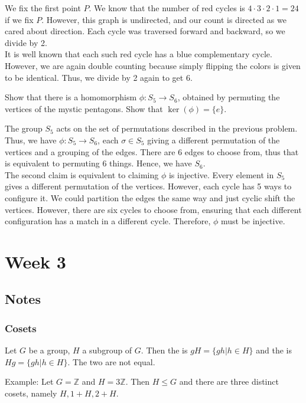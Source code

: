 \documentclass{scrartcl}
\begin{document}
\begin{soln}
	We fix the first point $P$. We know that the number of red cycles is $4 \cdot 3 \cdot 2 \cdot 1 = 24$ if we fix $P$. However, this graph is undirected, and our count is directed as we cared about direction. Each cycle was traversed forward and backward, so we divide by 2. \\
	It is well known that each such red cycle has a blue complementary cycle. However, we are again double counting because simply flipping the colors is given to be identical. Thus, we divide by 2 again to get 6.
\end{soln}

\begin{problem}[24]
    Show that there is a homomorphism $\phi : S_5 \rightarrow S_6$, obtained by permuting the vertices of the mystic pentagons. Show that $\ker(\phi) = \{e\}$.
\end{problem}

\begin{soln}
    The group $S_5$ acts on the set of permutations described in the previous problem. Thus, we have $\phi : S_5 \rightarrow S_6$, each $\sigma \in S_5$ giving a different permutation of the vertices and a grouping of the edges. There are $6$ edges to choose from, thus that is equivalent to permuting $6$ things. Hence, we have $S_6$. \\
    The second claim is equivalent to claiming $\phi$ is injective. Every element in $S_5$ gives a different permutation of the vertices. However, each cycle has 5 ways to configure it. We could partition the edges the same way and just cyclic shift the vertices. However, there are six cycles to choose from, ensuring that each different configuration has a match in a different cycle. Therefore, $\phi$ must be injective.
\end{soln}

\section{Week 3}
\subsection{Notes}
\subsubsection{Cosets}
\begin{definition}
    Let $G$ be a group, $H$ a subgroup of $G$. Then the  is $gH = \{gh | h \in H\}$ and the  is $Hg = \{gh | h \in H\}$. The two are not equal.
\end{definition}
Example: Let $G = \mathbb{Z}$ and $H = 3\mathbb{Z}$. Then $H \le G$ and there are three distinct cosets, namely $H, 1+H, 2+H$.
\end{document}
